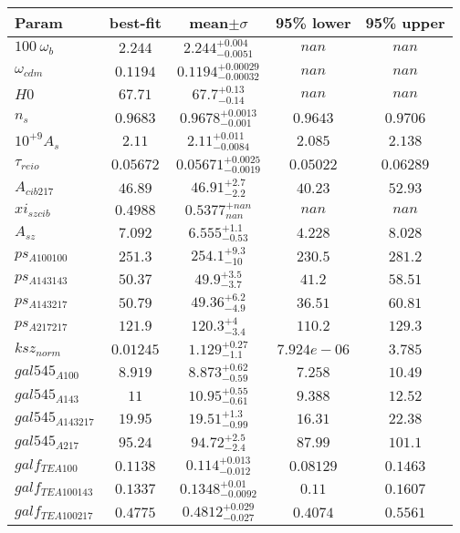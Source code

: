 \begin{tabular}{|l|c|c|c|c|} 
 \hline 
Param & best-fit & mean$\pm\sigma$ & 95\% lower & 95\% upper \\ \hline 
$100~\omega{}_{b }$ &$2.244$ & $2.244_{-0.0051}^{+0.004}$ & $nan$ & $nan$ \\ 
$\omega{}_{cdm }$ &$0.1194$ & $0.1194_{-0.00032}^{+0.00029}$ & $nan$ & $nan$ \\ 
$H0$ &$67.71$ & $67.7_{-0.14}^{+0.13}$ & $nan$ & $nan$ \\ 
$n_{s }$ &$0.9683$ & $0.9678_{-0.001}^{+0.0013}$ & $0.9643$ & $0.9706$ \\ 
$10^{+9}A_{s }$ &$2.11$ & $2.11_{-0.0084}^{+0.011}$ & $2.085$ & $2.138$ \\ 
$\tau{}_{reio }$ &$0.05672$ & $0.05671_{-0.0019}^{+0.0025}$ & $0.05022$ & $0.06289$ \\ 
$A_{cib 217 }$ &$46.89$ & $46.91_{-2.2}^{+2.7}$ & $40.23$ & $52.93$ \\ 
$xi_{sz cib }$ &$0.4988$ & $0.5377_{nan}^{+nan}$ & $nan$ & $nan$ \\ 
$A_{sz }$ &$7.092$ & $6.555_{-0.53}^{+1.1}$ & $4.228$ & $8.028$ \\ 
$ps_{A 100 100 }$ &$251.3$ & $254.1_{-10}^{+9.3}$ & $230.5$ & $281.2$ \\ 
$ps_{A 143 143 }$ &$50.37$ & $49.9_{-3.7}^{+3.5}$ & $41.2$ & $58.51$ \\ 
$ps_{A 143 217 }$ &$50.79$ & $49.36_{-4.9}^{+6.2}$ & $36.51$ & $60.81$ \\ 
$ps_{A 217 217 }$ &$121.9$ & $120.3_{-3.4}^{+4}$ & $110.2$ & $129.3$ \\ 
$ksz_{norm }$ &$0.01245$ & $1.129_{-1.1}^{+0.27}$ & $7.924e-06$ & $3.785$ \\ 
$gal545_{A 100 }$ &$8.919$ & $8.873_{-0.59}^{+0.62}$ & $7.258$ & $10.49$ \\ 
$gal545_{A 143 }$ &$11$ & $10.95_{-0.61}^{+0.55}$ & $9.388$ & $12.52$ \\ 
$gal545_{A 143 217 }$ &$19.95$ & $19.51_{-0.99}^{+1.3}$ & $16.31$ & $22.38$ \\ 
$gal545_{A 217 }$ &$95.24$ & $94.72_{-2.4}^{+2.5}$ & $87.99$ & $101.1$ \\ 
$galf_{TE A 100 }$ &$0.1138$ & $0.114_{-0.012}^{+0.013}$ & $0.08129$ & $0.1463$ \\ 
$galf_{TE A 100 143 }$ &$0.1337$ & $0.1348_{-0.0092}^{+0.01}$ & $0.11$ & $0.1607$ \\ 
$galf_{TE A 100 217 }$ &$0.4775$ & $0.4812_{-0.027}^{+0.029}$ & $0.4074$ & $0.5561$ \\ 

\end{tabular}
